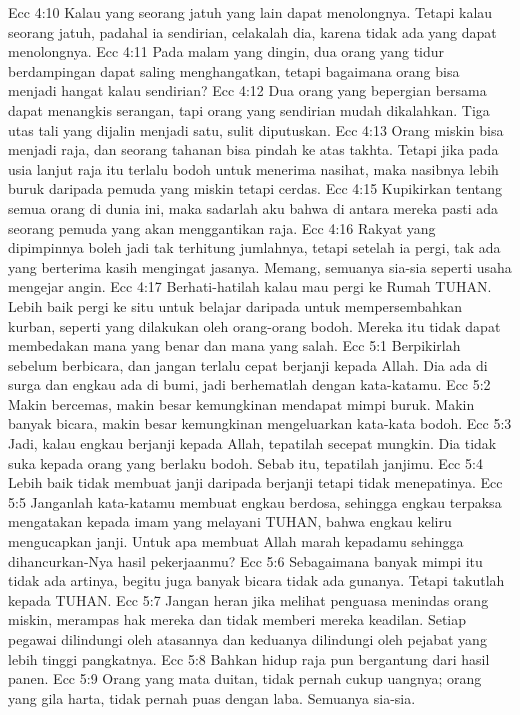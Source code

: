 Ecc 4:10  Kalau yang seorang jatuh yang lain dapat menolongnya. Tetapi kalau seorang jatuh, padahal ia sendirian, celakalah dia, karena tidak ada yang dapat menolongnya.
Ecc 4:11  Pada malam yang dingin, dua orang yang tidur berdampingan dapat saling menghangatkan, tetapi bagaimana orang bisa menjadi hangat kalau sendirian?
Ecc 4:12  Dua orang yang bepergian bersama dapat menangkis serangan, tapi orang yang sendirian mudah dikalahkan. Tiga utas tali yang dijalin menjadi satu, sulit diputuskan.
Ecc 4:13  Orang miskin bisa menjadi raja, dan seorang tahanan bisa pindah ke atas takhta. Tetapi jika pada usia lanjut raja itu terlalu bodoh untuk menerima nasihat, maka nasibnya lebih buruk daripada pemuda yang miskin tetapi cerdas.
Ecc 4:15  Kupikirkan tentang semua orang di dunia ini, maka sadarlah aku bahwa di antara mereka pasti ada seorang pemuda yang akan menggantikan raja.
Ecc 4:16  Rakyat yang dipimpinnya boleh jadi tak terhitung jumlahnya, tetapi setelah ia pergi, tak ada yang berterima kasih mengingat jasanya. Memang, semuanya sia-sia seperti usaha mengejar angin.
Ecc 4:17  Berhati-hatilah kalau mau pergi ke Rumah TUHAN. Lebih baik pergi ke situ untuk belajar daripada untuk mempersembahkan kurban, seperti yang dilakukan oleh orang-orang bodoh. Mereka itu tidak dapat membedakan mana yang benar dan mana yang salah.
Ecc 5:1  Berpikirlah sebelum berbicara, dan jangan terlalu cepat berjanji kepada Allah. Dia ada di surga dan engkau ada di bumi, jadi berhematlah dengan kata-katamu.
Ecc 5:2  Makin bercemas, makin besar kemungkinan mendapat mimpi buruk. Makin banyak bicara, makin besar kemungkinan mengeluarkan kata-kata bodoh.
Ecc 5:3  Jadi, kalau engkau berjanji kepada Allah, tepatilah secepat mungkin. Dia tidak suka kepada orang yang berlaku bodoh. Sebab itu, tepatilah janjimu.
Ecc 5:4  Lebih baik tidak membuat janji daripada berjanji tetapi tidak menepatinya.
Ecc 5:5  Janganlah kata-katamu membuat engkau berdosa, sehingga engkau terpaksa mengatakan kepada imam yang melayani TUHAN, bahwa engkau keliru mengucapkan janji. Untuk apa membuat Allah marah kepadamu sehingga dihancurkan-Nya hasil pekerjaanmu?
Ecc 5:6  Sebagaimana banyak mimpi itu tidak ada artinya, begitu juga banyak bicara tidak ada gunanya. Tetapi takutlah kepada TUHAN.
Ecc 5:7  Jangan heran jika melihat penguasa menindas orang miskin, merampas hak mereka dan tidak memberi mereka keadilan. Setiap pegawai dilindungi oleh atasannya dan keduanya dilindungi oleh pejabat yang lebih tinggi pangkatnya.
Ecc 5:8  Bahkan hidup raja pun bergantung dari hasil panen.
Ecc 5:9  Orang yang mata duitan, tidak pernah cukup uangnya; orang yang gila harta, tidak pernah puas dengan laba. Semuanya sia-sia.
